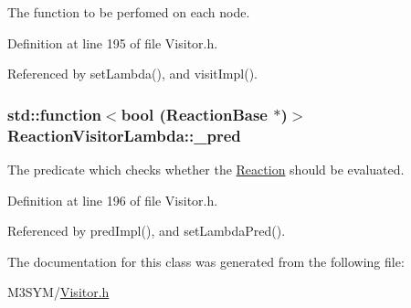 The function to be perfomed on each node. 



Definition at line 195 of file Visitor.\+h.



Referenced by set\+Lambda(), and visit\+Impl().

\hypertarget{classReactionVisitorLambda_aa23e41358778181613f193ef325b5813}{
\subsubsection[{\+\_\+pred}]{\setlength{\rightskip}{0pt plus 5cm}std\+::function$<$bool ({\bf Reaction\+Base} $\ast$)$>$ Reaction\+Visitor\+Lambda\+::\+\_\+pred\hspace{0.3cm}{\ttfamily [protected]}}}\label{classReactionVisitorLambda_aa23e41358778181613f193ef325b5813}


The predicate which checks whether the \hyperlink{classReaction}{Reaction} should be evaluated. 



Definition at line 196 of file Visitor.\+h.



Referenced by pred\+Impl(), and set\+Lambda\+Pred().



The documentation for this class was generated from the following file\+:\begin{DoxyCompactItemize}
\item 
M3\+S\+Y\+M/\hyperlink{Visitor_8h}{Visitor.\+h}\end{DoxyCompactItemize}
